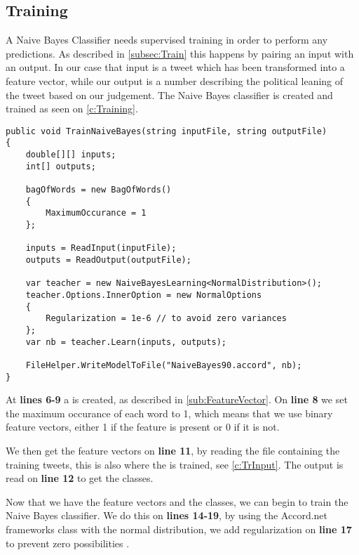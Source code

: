 \subsection{Training}
A Naive Bayes Classifier needs supervised training in order to perform any
predictions. As described in \autoref{subsec:Train} this happens by pairing an
input with an output. In our case that input is a tweet which has been
transformed into a feature vector, while our output is a number describing the political
leaning of the tweet based on our judgement. The Naive Bayes classifier is
created and trained as seen on \autoref{c:Training}.\nl

\begin{minipage}[H]{\linewidth}
\begin{lstlisting}[caption = Creating and training the classifier, label =
c:Training] 
public void TrainNaiveBayes(string inputFile, string outputFile)
{
    double[][] inputs;
    int[] outputs;

    bagOfWords = new BagOfWords()
    {
        MaximumOccurance = 1
    };

    inputs = ReadInput(inputFile);
    outputs = ReadOutput(outputFile);

    var teacher = new NaiveBayesLearning<NormalDistribution>();
    teacher.Options.InnerOption = new NormalOptions
    {
        Regularization = 1e-6 // to avoid zero variances
    };
    var nb = teacher.Learn(inputs, outputs);

    FileHelper.WriteModelToFile("NaiveBayes90.accord", nb);
}
\end{lstlisting}
\end{minipage}

At \textbf{lines 6-9} a  is created, as described in
\autoref{sub:FeatureVector}. On \textbf{line 8} we set the maximum occurance of
each word to 1, which means that we use binary feature vectors, either 1 if
the feature is present or 0 if it is not.

We then get the feature vectors on \textbf{line 11}, by reading the file
containing the training tweets, this is also where the  is
trained, see \autoref{c:TrInput}. The output is read on \textbf{line 12} to get
the classes.

Now that we have the feature vectors and the classes, we can begin to train the
Naive Bayes classifier. We do this on \textbf{lines 14-19}, by using the
Accord.net frameworks  class with the normal
distribution, we add regularization on \textbf{line 17} to prevent zero
possibilities \citep[P. 312]{MIBook}.




